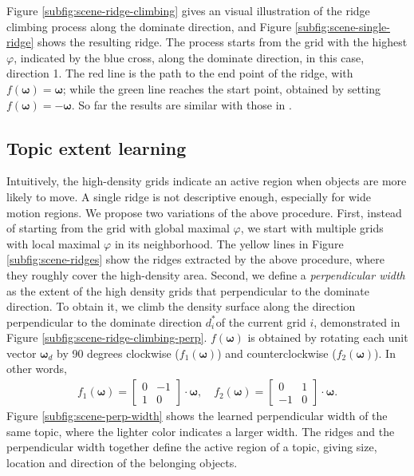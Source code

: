     Figure \ref{subfig:scene-ridge-climbing} gives an visual illustration of the ridge climbing process along the dominate direction, and Figure \ref{subfig:scene-single-ridge} shows the resulting ridge. The process starts from the grid with the highest $\varphi$, indicated by the blue cross, along the dominate direction, in this case, direction 1. 
    The red line is the path to the end point of the ridge, with $f(\bm{\omega}) = \bm{\omega}$; while the green line reaches the start point, obtained by setting $f(\bm{\omega}) = -\bm{\omega}$. So far the results are similar with those in \cite{zhao2013counting}.

    

\subsection{Topic extent learning}
    Intuitively, the high-density grids indicate an active region when objects are more likely to move.
    A single ridge is not descriptive enough, especially for wide motion regions. 
    We propose two variations of the above procedure.
    First, instead of starting from the grid with global maximal $\varphi$, we start with multiple grids with local maximal $\varphi$ in its neighborhood. 
    The yellow lines in Figure \ref{subfig:scene-ridges} show the ridges extracted by the above procedure, where they roughly cover the high-density area. 
    Second, we define a \emph{perpendicular width} as the extent of the high density grids that perpendicular to the dominate direction. To obtain it, we climb the density surface along the direction perpendicular to the dominate direction $d^*_i$of the current grid $i$, demonstrated in Figure \ref{subfig:scene-ridge-climbing-perp}.
    $f(\bm{\omega})$ is obtained by rotating each unit vector $\bm{\omega}_{d}$ by 90 degrees clockwise ($f_1(\bm{\omega})$) and counterclockwise ($f_2(\bm{\omega})$). In other words, 
    \begin{align*}
        f_1(\bm{\omega}) = \left[\begin{array}{cc} 0 & -1\\ 1 & 0\end{array}\right]\cdot\bm{\omega},\quad
        f_2(\bm{\omega}) = \left[\begin{array}{cc} 0 & 1\\ -1 & 0\end{array}\right]\cdot\bm{\omega}.
    \end{align*}
    Figure \ref{subfig:scene-perp-width} shows the learned perpendicular width of the same topic, where the lighter color indicates a larger width. The ridges and the perpendicular width together define the active region of a topic, giving size, location and direction of the belonging objects.


